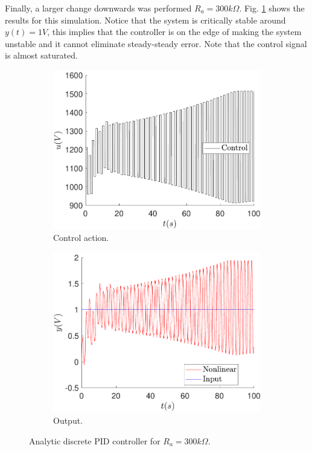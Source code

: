 	Finally, a larger change downwards was performed $R_a=300k\Omega$. Fig. \ref{fig:sens_ra_300} shows the results for this simulation. Notice that the system is critically stable around $y(t)=1V$, this implies that the controller is on the edge of making the system unstable and it cannot eliminate steady-steady error. Note that the control signal is almost saturated.
	\begin{figure}
        \centering
        \begin{subfigure}[b]{0.475\textwidth}
            \centering
            \includegraphics[scale=0.425]{files/sens_analysis/PID/control_analytic_a_300.pdf}
            \caption{Control action.}
        \end{subfigure}
        \vskip0.1cm
        \begin{subfigure}[b]{0.475\textwidth}   
            \centering 
            \includegraphics[scale=0.425]{files/sens_analysis/PID/analytic_sensitivity_a_300.pdf}
            \caption{Output.}
        \end{subfigure}
        \caption{Analytic discrete PID controller for $R_a=300k\Omega$.}
        \label{fig:sens_ra_300}
	\end{figure}
	
